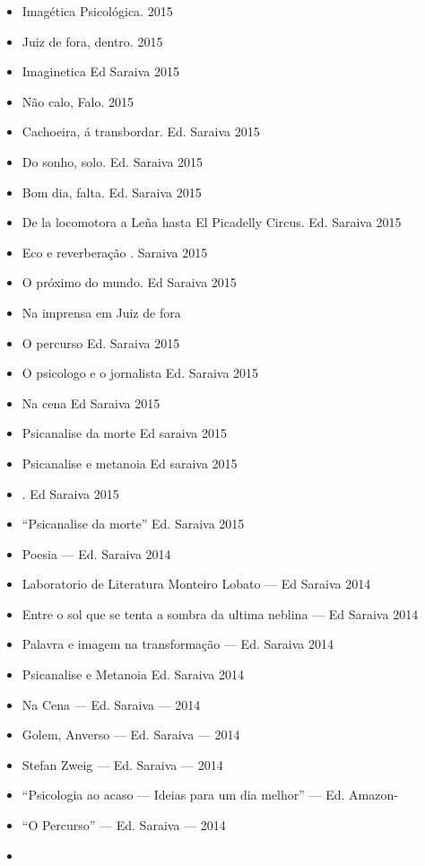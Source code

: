 \begin{itemize}
\itemsep1pt\parskip0pt
\item
  Imagética Psicológica. 2015
\item
  Juiz de fora, dentro. 2015
\item
  Imaginetica Ed Saraiva 2015
\item
  Não calo, Falo. 2015
\item
  Cachoeira, á transbordar. Ed. Saraiva 2015
\item
  Do sonho, solo. Ed. Saraiva 2015
\item
  Bom dia, falta. Ed. Saraiva 2015
\item
  De la locomotora a Leña hasta El Picadelly Circus. Ed. Saraiva 2015
\item
  Eco e reverberação . Saraiva 2015
\item
  O próximo do mundo. Ed Saraiva 2015
\item
  Na imprensa em Juiz de fora
\item
  O percurso Ed. Saraiva 2015
\item
  O psicologo e o jornalista Ed. Saraiva 2015
\item
  Na cena Ed Saraiva 2015
\item
  Psicanalise da morte Ed saraiva 2015
\item
  Psicanalise e metanoia Ed saraiva 2015
\item
    . Ed Saraiva 2015
\item
  ``Psicanalise da morte'' Ed. Saraiva 2015
\item
  Poesia --- Ed. Saraiva 2014
\item
  Laboratorio de Literatura Monteiro Lobato --- Ed Saraiva 2014
\item
  Entre o sol que se tenta a sombra da ultima neblina --- Ed Saraiva
  2014
\item
  Palavra e imagem na transformação --- Ed. Saraiva 2014
\item
  Psicanalise e Metanoia Ed. Saraiva 2014
\item
  Na Cena --- Ed. Saraiva --- 2014
\item
  Golem, Anverso --- Ed. Saraiva --- 2014
\item
  Stefan Zweig --- Ed. Saraiva --- 2014
\item
  ``Psicologia ao acaso --- Ideias para um dia melhor'' --- Ed. Amazon-
\item
  ``O Percurso'' --- Ed. Saraiva --- 2014
\item

\end{itemize}
